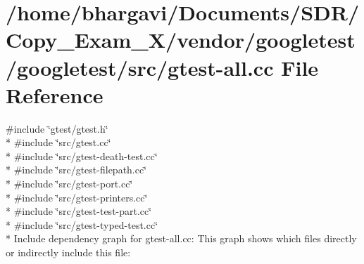 \hypertarget{gtest-all_8cc}{}\section{/home/bhargavi/\+Documents/\+S\+D\+R/\+Copy\+\_\+\+Exam\+\_\+X/vendor/googletest/googletest/src/gtest-\/all.cc File Reference}
\label{gtest-all_8cc}
{\ttfamily \#include \char`\"{}gtest/gtest.\+h\char`\"{}}\\*
{\ttfamily \#include \char`\"{}src/gtest.\+cc\char`\"{}}\\*
{\ttfamily \#include \char`\"{}src/gtest-\/death-\/test.\+cc\char`\"{}}\\*
{\ttfamily \#include \char`\"{}src/gtest-\/filepath.\+cc\char`\"{}}\\*
{\ttfamily \#include \char`\"{}src/gtest-\/port.\+cc\char`\"{}}\\*
{\ttfamily \#include \char`\"{}src/gtest-\/printers.\+cc\char`\"{}}\\*
{\ttfamily \#include \char`\"{}src/gtest-\/test-\/part.\+cc\char`\"{}}\\*
{\ttfamily \#include \char`\"{}src/gtest-\/typed-\/test.\+cc\char`\"{}}\\*
Include dependency graph for gtest-\/all.cc\+:
This graph shows which files directly or indirectly include this file\+:
